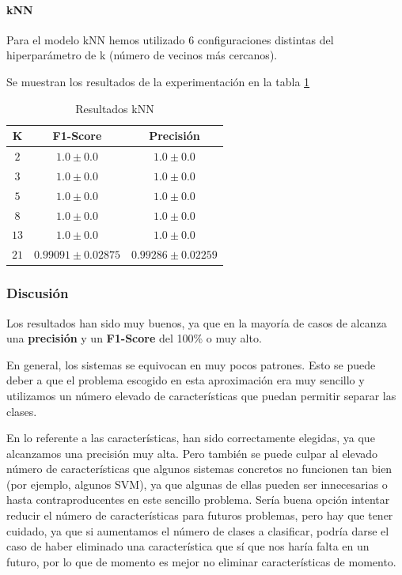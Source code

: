 \documentclass[12pt]{article}
\begin{document}
\paragraph{kNN}
Para el modelo kNN hemos utilizado 6 configuraciones distintas del hiperparámetro de k (número de vecinos más cercanos).

Se muestran los resultados de la experimentación en la tabla \ref{Tab:kNN}

\begin{table}[ht]
	\caption{Resultados kNN}
	\centering
		 \begin{tabular}{||c c c||}
			 \hline
			 K & F1-Score & Precisión  \\ [0.5ex]
			 \hline\hline
			 $2$ & $1.0 \pm 0.0$ & $1.0 \pm 0.0$ \\
			 \hline
			 $3$ & $1.0 \pm 0.0$ & $1.0 \pm 0.0$ \\
			 \hline
			 $5$ & $1.0 \pm 0.0$ & $1.0 \pm 0.0$ \\
			 \hline
			 $8$ & $1.0 \pm 0.0$ & $1.0 \pm 0.0$ \\
			 \hline
			 $13$ & $1.0 \pm 0.0$ & $1.0 \pm 0.0$ \\
			 \hline
			 $21$ & $0.99091 \pm 0.02875$ & $0.99286 \pm 0.02259$ \\
			 \hline
		 \end{tabular}
	\label{Tab:kNN}
\end{table}

\subsubsection{Discusión}
Los resultados han sido muy buenos, ya que en la mayoría de casos de alcanza una \textbf{precisión} y un \textbf{F1-Score} del 100\% o muy alto. 

\bigskip
En general, los sistemas se equivocan en muy pocos patrones. Esto se puede deber a que el problema escogido en esta aproximación
era muy sencillo y utilizamos un número elevado de características que puedan permitir separar las clases.

\bigskip
En lo referente a las características, han sido correctamente elegidas, ya que alcanzamos una precisión muy alta. Pero también
se puede culpar al elevado número de características que algunos sistemas concretos no funcionen tan bien (por ejemplo, algunos SVM), 
ya que algunas de ellas pueden ser innecesarias o hasta contraproducentes en este sencillo problema. Sería buena opción intentar 
reducir el número de características para futuros problemas, pero hay que tener cuidado, ya que si aumentamos el número de clases a 
clasificar, podría darse el caso de haber eliminado una característica que sí que nos haría falta en un futuro, por lo que de momento 
es mejor no eliminar características de momento.
\end{document}
